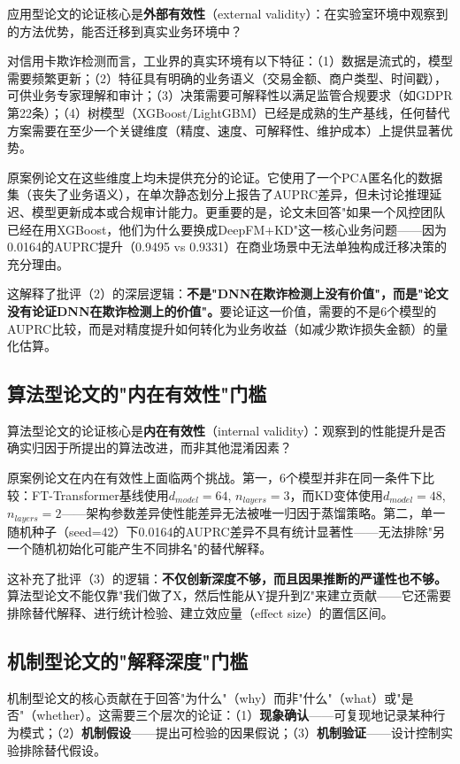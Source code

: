 \documentclass[UTF8,a4paper,12pt,fontset=fandol]{ctexart}
\begin{document}
应用型论文的论证核心是\textbf{外部有效性}（external validity）：在实验室环境中观察到的方法优势，能否迁移到真实业务环境中\cite{sculley2015hidden}？

对信用卡欺诈检测而言，工业界的真实环境有以下特征：（1）数据是流式的，模型需要频繁更新；（2）特征具有明确的业务语义（交易金额、商户类型、时间戳），可供业务专家理解和审计；（3）决策需要可解释性以满足监管合规要求（如GDPR第22条）；（4）树模型（XGBoost/LightGBM）已经是成熟的生产基线，任何替代方案需要在至少一个关键维度（精度、速度、可解释性、维护成本）上提供显著优势。

原案例论文在这些维度上均未提供充分的论证。它使用了一个PCA匿名化的数据集（丧失了业务语义），在单次静态划分上报告了AUPRC差异，但未讨论推理延迟、模型更新成本或合规审计能力。更重要的是，论文未回答"如果一个风控团队已经在用XGBoost，他们为什么要换成DeepFM+KD"这一核心业务问题——因为0.0164的AUPRC提升（0.9495 vs 0.9331）在商业场景中无法单独构成迁移决策的充分理由。

这解释了批评（2）的深层逻辑：\textbf{不是"DNN在欺诈检测上没有价值"，而是"论文没有论证DNN在欺诈检测上的价值"。}要论证这一价值，需要的不是6个模型的AUPRC比较，而是对精度提升如何转化为业务收益（如减少欺诈损失金额）的量化估算。

\subsection{算法型论文的"内在有效性"门槛}

算法型论文的论证核心是\textbf{内在有效性}（internal validity）：观察到的性能提升是否确实归因于所提出的算法改进，而非其他混淆因素\cite{henderson2018deep}？

原案例论文在内在有效性上面临两个挑战。第一，6个模型并非在同一条件下比较：FT-Transformer基线使用$d_{model}=64$, $n_{layers}=3$，而KD变体使用$d_{model}=48$, $n_{layers}=2$——架构参数差异使性能差异无法被唯一归因于蒸馏策略。第二，单一随机种子（seed=42）下0.0164的AUPRC差异不具有统计显著性——无法排除"另一个随机初始化可能产生不同排名"的替代解释。

这补充了批评（3）的逻辑：\textbf{不仅创新深度不够，而且因果推断的严谨性也不够。}算法型论文不能仅靠"我们做了X，然后性能从Y提升到Z"来建立贡献——它还需要排除替代解释、进行统计检验、建立效应量（effect size）的置信区间。

\subsection{机制型论文的"解释深度"门槛}

机制型论文的核心贡献在于回答"为什么"（why）而非"什么"（what）或"是否"（whether）。这需要三个层次的论证：（1）\textbf{现象确认}——可复现地记录某种行为模式；（2）\textbf{机制假设}——提出可检验的因果假说；（3）\textbf{机制验证}——设计控制实验排除替代假设。
\end{document}
